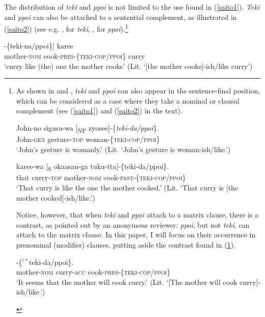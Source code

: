 \documentclass[output=paper]{langscibook}
\begin{document}
The distribution of \emph{teki} and  \emph{ppoi} is not limited to the use found in (\ref{saito1}).  \emph{Teki} and  \emph{ppoi} can also be attached to a sentential complement, as illustrated in (\ref{saito2}) (see e.g. \citealt{Yamashita2000}, \citealt{Saito2017} for \emph{teki},  \citealt{Kojima2003}, \citealt{Yamada2014} for  \emph{ppoi}).\footnote{As shown in  and , \textit{teki} and \textit{ppoi} can also appear in the sentence-final position, which can be considered as a case where they take a nominal or clausal complement (see (\ref{saito1}) and (\ref{saito2}) in the text). 

\begin{exe}
\ex \label{saitoi}
\gll John-no sigusa-wa [\textsubscript{NP} zyosee]-\{\emph{teki-da/ppoi}\}.\\
John-\textsc{gen} gesture-\textsc{top} {} woman-\{\textsc{teki-cop/ppoi}\}\\ 
\glt `John’s gesture is womanly.' (Lit. ‘John’s gesture is woman-ish/like.’)

\ex \label{saitoii}
 {karee-wa} [\textsubscript{S} {okaasan-ga} {tuku-tta}]-\{{teki-da/ppoi}\}.\\
that curry-\textsc{top} {} mother-\textsc{nom} cook-\textsc{past}-\{\textsc{teki-cop/ppoi}\}\\ 
\glt ‘That curry is like the one the mother cooked.’ (Lit. ‘That curry is [the mother cooked]-ish/like.’)

\end{exe}

Notice, however, that when \emph{teki} and \emph{ppoi} attach to a matrix clause, there is a contrast, as pointed out by an anonymous reviewer: \emph{ppoi}, but not \emph{teki}, can attach to the matrix clause. In this paper, I will focus on their occurrence in prenominal (modifier) clauses, putting aside the contrast found in (\ref{saitoiii}).
\begin{exe}
\ex \label{saitoiii}
-\{$^{?*}${teki-da/ppoi}\}.\\
mother-\textsc{nom} curry-\textsc{acc} cook-\textsc{pres}-\{\textsc{teki-cop/ppoi}\}\\ 
\glt ‘It seems that the mother will cook curry.’ (Lit. ‘[The mother will cook curry]-ish/like.’)
\end{exe}
}

\begin{exe}
\ex \label{saito2}
\gll [[\textsubscript{S} {okaasan-ga}   {tuku-ru}]-\{{teki-na/ppoi}\}] {karee}\\
{} mother-\textsc{nom} cook-\textsc{pres}-\{\textsc{teki-cop/ppoi}\} curry\\ 
\glt ‘curry like (the) one the mother cooks’ (Lit. ‘[the mother cooks]-ish/like curry’)
\end{exe}
\end{document}
